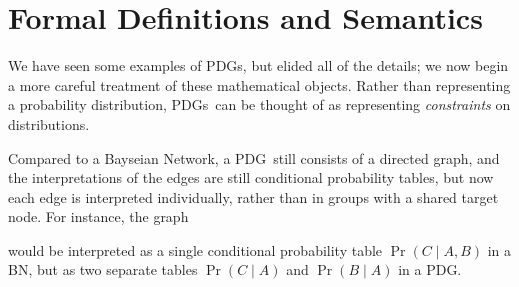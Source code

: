 \documentclass{article}
\newcommand\changeon{\color{note-fg} }
\newcommand{\MN}{PDG}%
\newcommand{\MNs}{PDGs}
\begin{document}
	



	
	
	\section{Formal Definitions and Semantics}\label{sec:formal+semantics}
	
	\changeon
	We have seen some examples of \MNs, but elided all of the details; we now begin a more careful treatment of these mathematical objects. Rather than representing a probability distribution, \MNs\ can be thought of as representing \emph{constraints} on distributions.
	
	Compared to a Bayseian Network, a \MN\ still consists of a directed graph, and the interpretations of the edges are still conditional probability tables, but now each edge is interpreted individually, rather than in groups with a shared target node. For instance, the graph
	would be interpreted as a single conditional probability table $\Pr(C\mid A, B)$ in a BN, but as two separate tables $\Pr(C \mid A)$ and $\Pr(B \mid A)$ in a \MN.
\end{document}
